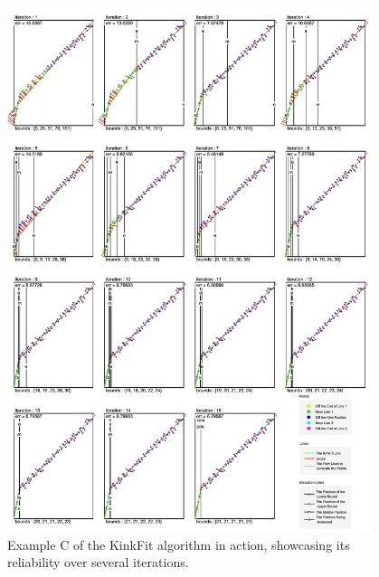 \begin{figure}[h!]
  \centering
    \includegraphics[width=0.95\textwidth]{Chapter4/Figs/KinkFit_H.jpg}
    \caption{Example C of the KinkFit algorithm in action, showcasing its reliability over several iterations.}\label{fig:KinkFitH}
\end{figure}



